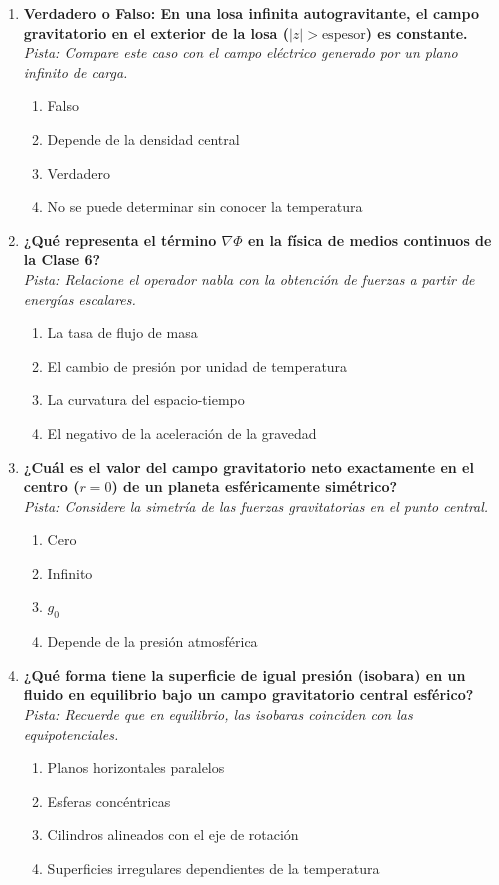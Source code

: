 \documentclass[12pt,a4paper]{article}
\begin{document}
\begin{enumerate}[label=\textbf{\arabic*.}, itemsep=1.5em]
\item \textbf{Verdadero o Falso: En una losa infinita autogravitante, el campo gravitatorio en el exterior de la losa ($|z| > \text{espesor}$) es constante.} \\
\textit{Pista: Compare este caso con el campo eléctrico generado por un plano infinito de carga.}
\begin{enumerate}[label=\alph*), leftmargin=*]
    \item Falso
    \item Depende de la densidad central
    \item Verdadero
    \item No se puede determinar sin conocer la temperatura
\end{enumerate}

\item \textbf{¿Qué representa el término $\nabla \Phi$ en la física de medios continuos de la Clase 6?} \\
\textit{Pista: Relacione el operador nabla con la obtención de fuerzas a partir de energías escalares.}
\begin{enumerate}[label=\alph*), leftmargin=*]
    \item La tasa de flujo de masa
    \item El cambio de presión por unidad de temperatura
    \item La curvatura del espacio-tiempo
    \item El negativo de la aceleración de la gravedad
\end{enumerate}

\item \textbf{¿Cuál es el valor del campo gravitatorio neto exactamente en el centro ($r=0$) de un planeta esféricamente simétrico?} \\
\textit{Pista: Considere la simetría de las fuerzas gravitatorias en el punto central.}
\begin{enumerate}[label=\alph*), leftmargin=*]
    \item Cero
    \item Infinito
    \item $g_0$
    \item Depende de la presión atmosférica
\end{enumerate}

\item \textbf{¿Qué forma tiene la superficie de igual presión (isobara) en un fluido en equilibrio bajo un campo gravitatorio central esférico?} \\
\textit{Pista: Recuerde que en equilibrio, las isobaras coinciden con las equipotenciales.}
\begin{enumerate}[label=\alph*), leftmargin=*]
    \item Planos horizontales paralelos
    \item Esferas concéntricas
    \item Cilindros alineados con el eje de rotación
    \item Superficies irregulares dependientes de la temperatura
\end{enumerate}


\end{enumerate}
\end{document}
